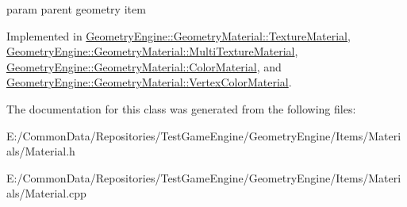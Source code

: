 param parent geometry item 

Implemented in \mbox{\hyperlink{class_geometry_engine_1_1_geometry_material_1_1_texture_material_a985cdde7240f2acb18cd2944c5ca6193}{Geometry\+Engine\+::\+Geometry\+Material\+::\+Texture\+Material}}, \mbox{\hyperlink{class_geometry_engine_1_1_geometry_material_1_1_multi_texture_material_a5f07e3b2b0867d3905f912159ef2f67b}{Geometry\+Engine\+::\+Geometry\+Material\+::\+Multi\+Texture\+Material}}, \mbox{\hyperlink{class_geometry_engine_1_1_geometry_material_1_1_color_material_afc9bcbd2091f6592dfb8a6ace1d4adfb}{Geometry\+Engine\+::\+Geometry\+Material\+::\+Color\+Material}}, and \mbox{\hyperlink{class_geometry_engine_1_1_geometry_material_1_1_vertex_color_material_a11bf01fb1d5ef41fb1a9cf4080c98b8c}{Geometry\+Engine\+::\+Geometry\+Material\+::\+Vertex\+Color\+Material}}.



The documentation for this class was generated from the following files\+:\begin{DoxyCompactItemize}
\item 
E\+:/\+Common\+Data/\+Repositories/\+Test\+Game\+Engine/\+Geometry\+Engine/\+Items/\+Materials/Material.\+h\item 
E\+:/\+Common\+Data/\+Repositories/\+Test\+Game\+Engine/\+Geometry\+Engine/\+Items/\+Materials/Material.\+cpp\end{DoxyCompactItemize}
